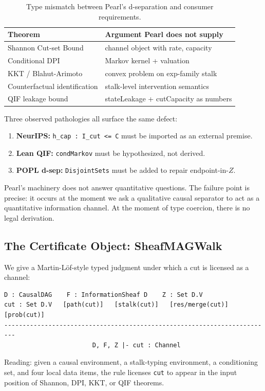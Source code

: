 \documentclass[acmsmall,screen,nonacm]{acmart}
\newcommand{\lean}[1]{\lstinline!#1!}
\begin{document}
\begin{table}[ht]
\centering
\caption{Type mismatch between Pearl's d-separation and consumer requirements.}
\begin{tabular}{ll}
\toprule
Theorem & Argument Pearl does not supply \\
\midrule
Shannon Cut-set Bound & channel object with rate, capacity \\
Conditional DPI & Markov kernel + valuation \\
KKT / Blahut-Arimoto & convex problem on exp-family stalk \\
Counterfactual identification & stalk-level intervention semantics \\
QIF leakage bound & stateLeakage + cutCapacity as numbers \\
\bottomrule
\end{tabular}
\end{table}

Three observed pathologies all surface the same defect:
\begin{enumerate}
    \item \textbf{NeurIPS:} \lstinline!h_cap : I_cut <= C! must be imported as an external premise.
    \item \textbf{Lean QIF:} \lean{condMarkov} must be hypothesized, not derived.
    \item \textbf{POPL d-sep:} \lean{DisjointSets} must be added to repair endpoint-in-$Z$.
\end{enumerate}

Pearl's machinery does not answer quantitative questions. The failure point is precise: it occurs at the moment we ask a qualitative causal separator to act as a quantitative information channel. At the moment of type coercion, there is no legal derivation.

\subsection{The Certificate Object: SheafMAGWalk}
We give a Martin-L\"of-style typed judgment under which a cut is licensed as a channel:
\begin{lstlisting}
D : CausalDAG    F : InformationSheaf D    Z : Set D.V
cut : Set D.V   [path(cut)]   [stalk(cut)]   [res/merge(cut)]   [prob(cut)]
-------------------------------------------------------------------------
                        D, F, Z |- cut : Channel
\end{lstlisting}
Reading: given a causal environment, a stalk-typing environment, a conditioning set, and four local data items, the rule licenses \lean{cut} to appear in the input position of Shannon, DPI, KKT, or QIF theorems.
\end{document}

